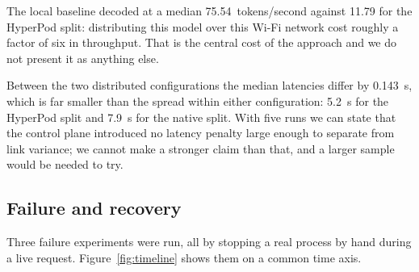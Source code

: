 The local baseline decoded at a median \SI{75.54}{tokens/second} against
\SI{11.79}{} for the HyperPod split: distributing this model over this Wi-Fi
network cost roughly a factor of six in throughput. That is the central cost of
the approach and we do not present it as anything else.

Between the two distributed configurations the median latencies differ by
\SI{0.143}{\second}, which is far smaller than the spread within either
configuration: \SI{5.2}{\second} for the HyperPod split and \SI{7.9}{\second}
for the native split. With five runs we can state that the control plane
introduced no latency penalty large enough to separate from link variance; we
cannot make a stronger claim than that, and a larger sample would be needed to
try.

\subsection{Failure and recovery}
\label{sec:recovery}

Three failure experiments were run, all by stopping a real
 process by hand during a live request.
Figure~\ref{fig:timeline} shows them on a common time axis.

